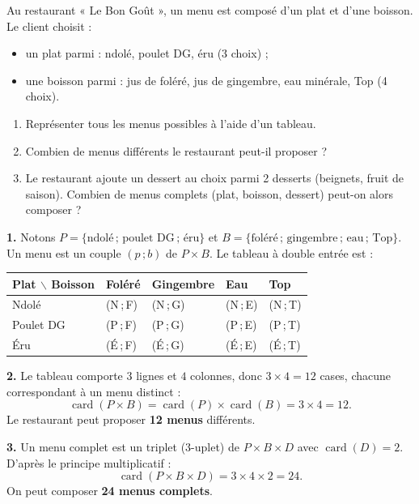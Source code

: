 \documentclass[11pt]{article}
\begin{document}
\begin{exoresolu}
Au restaurant « Le Bon Goût », un menu est composé d'un plat et d'une boisson. Le client choisit :
\begin{itemize}
\item un plat parmi : ndolé, poulet DG, éru (3 choix) ;
\item une boisson parmi : jus de foléré, jus de gingembre, eau minérale, Top (4 choix).
\end{itemize}
\begin{enumerate}
\item Représenter tous les menus possibles à l'aide d'un tableau.
\item Combien de menus différents le restaurant peut-il proposer ?
\item Le restaurant ajoute un dessert au choix parmi 2 desserts (beignets, fruit de saison). Combien de menus complets (plat, boisson, dessert) peut-on alors composer ?
\end{enumerate}
\tcblower
\textbf{1.} Notons $P=\{\text{ndolé}\,;\,\text{poulet DG}\,;\,\text{éru}\}$ et $B=\{\text{foléré}\,;\,\text{gingembre}\,;\,\text{eau}\,;\,\text{Top}\}$. Un menu est un couple $(p\,;b)$ de $P\times B$. Le tableau à double entrée est :

\begin{center}
\begin{tabularx}{\linewidth}{|l|X|X|X|X|}
\hline
\rowcolor{popblueL} Plat $\backslash$ Boisson & Foléré & Gingembre & Eau & Top \\
\hline
Ndolé & (N\,;\,F) & (N\,;\,G) & (N\,;\,E) & (N\,;\,T) \\
\hline
Poulet DG & (P\,;\,F) & (P\,;\,G) & (P\,;\,E) & (P\,;\,T) \\
\hline
Éru & (É\,;\,F) & (É\,;\,G) & (É\,;\,E) & (É\,;\,T) \\
\hline
\end{tabularx}
\end{center}

\textbf{2.} Le tableau comporte $3$ lignes et $4$ colonnes, donc $3\times 4=12$ cases, chacune correspondant à un menu distinct :
\[ \operatorname{card}(P\times B)=\operatorname{card}(P)\times \operatorname{card}(B)=3\times 4=12. \]
Le restaurant peut proposer \textbf{12 menus} différents.

\textbf{3.} Un menu complet est un triplet (3-uplet) de $P\times B\times D$ avec $\operatorname{card}(D)=2$. D'après le principe multiplicatif :
\[ \operatorname{card}(P\times B\times D)=3\times 4\times 2=24. \]
On peut composer \textbf{24 menus complets}.
\end{exoresolu}
\end{document}
